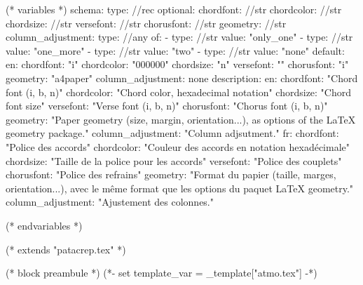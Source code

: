 %
%
%

(* variables *)
schema:
  type: //rec
  optional:
    chordfont: //str
    chordcolor: //str
    chordsize: //str
    versefont: //str
    chorusfont: //str
    geometry: //str
    column_adjustment:
      type: //any
      of:
        - type: //str
          value: "only_one"
        - type: //str
          value: "one_more"
        - type: //str
          value: "two"
        - type: //str
          value: "none"
default:
  en:
    chordfont: "i"
    chordcolor: "000000"
    chordsize: "n"
    versefont: ""
    chorusfont: "i"
    geometry: "a4paper"
    column_adjustment: none
description:
  en:
    chordfont: "Chord font (i, b, n)"
    chordcolor: "Chord color, hexadecimal notation"
    chordsize: "Chord font size"
    versefont: "Verse font (i, b, n)"
    chorusfont: "Chorus font (i, b, n)"
    geometry: "Paper geometry (size, margin, orientation...), as options of the LaTeX geometry package."
    column_adjustment: "Column adjsutment."
  fr:
    chordfont: "Police des accords"
    chordcolor: "Couleur des accords en notation hexadécimale"
    chordsize: "Taille de la police pour les accords"
    versefont: "Police des couplets"
    chorusfont: "Police des refrains"
    geometry: "Format du papier (taille, marges, orientation...), avec le même format que les options du paquet LaTeX geometry."
    column_adjustment: "Ajustement des colonnes."


(* endvariables *)

(* extends "patacrep.tex" *)

(* block preambule *)
(*- set template_var = _template["atmo.tex"] -*)
\renewcommand{\songmark}{\markboth{\thesongnum}{\thesongnum}}

